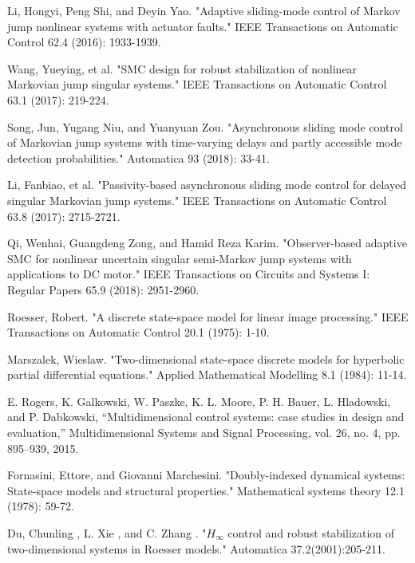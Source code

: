 \documentclass[conference]{IEEEtran}
\begin{document}
\begin{thebibliography}{1}
	Li, Hongyi, Peng Shi, and Deyin Yao. "Adaptive sliding-mode control of Markov jump nonlinear systems with actuator faults." IEEE Transactions on Automatic Control 62.4 (2016): 1933-1939.
	
	Wang, Yueying, et al. "SMC design for robust stabilization of nonlinear Markovian jump singular systems." IEEE Transactions on Automatic Control 63.1 (2017): 219-224.
	
	Song, Jun, Yugang Niu, and Yuanyuan Zou. "Asynchronous sliding mode control of Markovian jump systems with time-varying delays and partly accessible mode detection probabilities." Automatica 93 (2018): 33-41.

	Li, Fanbiao, et al. "Passivity-based asynchronous sliding mode control for delayed singular Markovian jump systems." IEEE Transactions on Automatic Control 63.8 (2017): 2715-2721.
	
	Qi, Wenhai, Guangdeng Zong, and Hamid Reza Karim. "Observer-based adaptive SMC for nonlinear uncertain singular semi-Markov jump systems with applications to DC motor." IEEE Transactions on Circuits and Systems I: Regular Papers 65.9 (2018): 2951-2960.
	
	
	
	
	
	
	
	
	Roesser, Robert. "A discrete state-space model for linear image processing." IEEE Transactions on Automatic Control 20.1 (1975): 1-10.
	
	Marszalek, Wieslaw. "Two-dimensional state-space discrete models for hyperbolic partial differential equations." Applied Mathematical Modelling 8.1 (1984): 11-14.
	
	E. Rogers, K. Galkowski, W. Paszke, K. L. Moore, P. H. Bauer, L. Hladowski, and P. Dabkowski, “Multidimensional control systems: case studies in design and evaluation,” Multidimensional Systems and Signal Processing, vol. 26, no. 4, pp. 895–939, 2015.
	
	Fornasini, Ettore, and Giovanni Marchesini. "Doubly-indexed dynamical systems: State-space models and structural properties." Mathematical systems theory 12.1 (1978): 59-72.
	
	Du, Chunling , L. Xie , and C. Zhang . "$H_{\infty}$ control and robust stabilization of two-dimensional systems in Roesser models." Automatica 37.2(2001):205-211.
	

\end{thebibliography}
\end{document}
